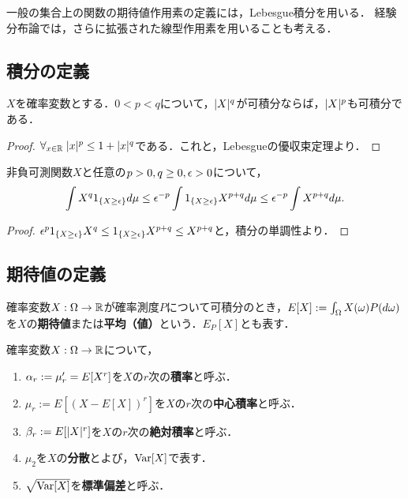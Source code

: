 \documentclass[uplatex,dvipdfmx]{jsreport}
\begin{document}
\begin{tcolorbox}[colframe=ForestGreen, colback=ForestGreen!10!white,breakable,colbacktitle=ForestGreen!40!white,coltitle=black,fonttitle=\bfseries\sffamily,
title=]
    一般の集合上の関数の期待値作用素の定義には，Lebesgue積分を用いる．
    経験分布論では，さらに拡張された線型作用素を用いることも考える．
\end{tcolorbox}

\subsection{積分の定義}

\begin{proposition}
    $X$を確率変数とする．$0<p<q$について，$\lvert X\rvert^q$が可積分ならば，$\lvert X\rvert^p$も可積分である．
\end{proposition}
\begin{proof}
    $\forall_{x\in\mathbb{R}}\;\lvert x\rvert^p\le 1+\lvert x\rvert^q$である．これと，Lebesgueの優収束定理より．
\end{proof}

\begin{proposition}[Markovの不等式]
    非負可測関数$X$と任意の$p>0,q\ge 0,\epsilon>0$について，
    \[\int X^q1_{\left\{X\ge\epsilon\right\}}d\mu\le\epsilon^{-p}\int 1_{\left\{X\ge\epsilon\right\}}X^{p+q}d\mu\le\epsilon^{-p}\int X^{p+q}d\mu.\]
\end{proposition}
\begin{proof}
    $\epsilon^p1_{\left\{X\ge\epsilon\right\}}X^q\le 1_{\left\{X\ge\epsilon\right\}}X^{p+q}\le X^{p+q}$と，積分の単調性より．
\end{proof}

\subsection{期待値の定義}

\begin{definition}
    確率変数$X:\Omega\to\mathbb{R}$が確率測度$P$について可積分のとき，$E[X]:=\int_\Omega X(\omega)P(d\omega)$を$X$の\textbf{期待値}または\textbf{平均（値）}という．$E_P[X]$とも表す．
\end{definition}

\begin{definition}
    確率変数$X:\Omega\to\mathbb{R}$について，
    \begin{enumerate}
        \item $\alpha_r:=\mu'_r=E[X^r]$を$X$の$r$次の\textbf{積率}と呼ぶ．
        \item $\mu_r:=E[(X-E[X])^r]$を$X$の$r$次の\textbf{中心積率}と呼ぶ．
        \item $\beta_r:=E[\lvert X\rvert^r]$を$X$の$r$次の\textbf{絶対積率}と呼ぶ．
        \item $\mu_2$を$X$の\textbf{分散}とよび，$\mathrm{Var}[X]$で表す．
        \item $\sqrt{\mathrm{Var}[X]}$を\textbf{標準偏差}と呼ぶ．
    \end{enumerate}
\end{definition}
\end{document}
